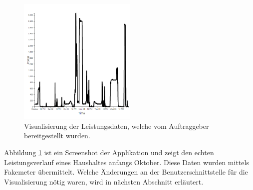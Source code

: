 \begin{figure}
    \centering
    \includegraphics[width=0.5\textwidth]{gfx/markusData}
    \caption{
        Visualisierung der Leistungsdaten, welche vom Auftraggeber bereitgestellt wurden.
    }
    \label{fig:markusData}
\end{figure}
Abbildung \ref{fig:markusData} ist ein Screenshot der Applikation und zeigt den
echten Leistungsverlauf eines Haushaltes anfangs Oktober.
Diese Daten wurden mittels Fakemeter übermittelt.
Welche Änderungen an der Benutzerschnittstelle für die Visualisierung nötig waren,
wird in nächsten Abschnitt erläutert.



